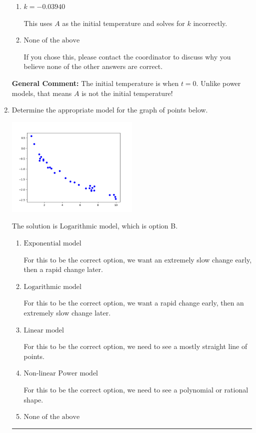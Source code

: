 \documentclass{extbook}[14pt]
\newcommand{\litem}[1]{\item #1

\rule{\textwidth}{0.4pt}}
\begin{document}
\begin{enumerate}
{\begin{enumerate}[label=\Alph*.]
* This is the correct option.
\item \( k = -0.03940 \)

This uses $A$ as the initial temperature and solves for $k$ incorrectly.
\item \( \text{None of the above} \)

If you chose this, please contact the coordinator to discuss why you believe none of the other answers are correct.
\end{enumerate}

\textbf{General Comment:} The initial temperature is when $t = 0$. Unlike power models, that means $A$ is not the initial temperature!
}
\litem{
Determine the appropriate model for the graph of points below.

\begin{center}
    \includegraphics[width=0.5\textwidth]{../Figures/identifyModelGraph11A.png}
\end{center}


The solution is \( \text{Logarithmic model} \), which is option B.\begin{enumerate}[label=\Alph*.]
\item \( \text{Exponential model} \)

For this to be the correct option, we want an extremely slow change early, then a rapid change later.
\item \( \text{Logarithmic model} \)

For this to be the correct option, we want a rapid change early, then an extremely slow change later.
\item \( \text{Linear model} \)

For this to be the correct option, we need to see a mostly straight line of points.
\item \( \text{Non-linear Power model} \)

For this to be the correct option, we need to see a polynomial or rational shape.
\item \( \text{None of the above} \)


\end{enumerate}}
\end{enumerate}
\end{document}
